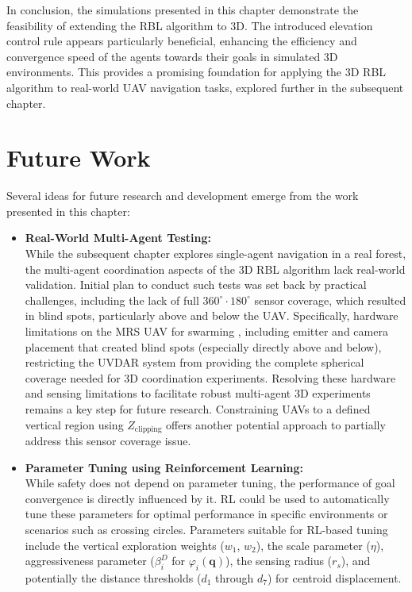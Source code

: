         In conclusion, the simulations presented in this chapter demonstrate the feasibility of extending the \ac{RBL} algorithm to 3D. 
        The introduced elevation control rule appears particularly beneficial, enhancing the efficiency and convergence speed of the agents towards their goals in simulated 3D environments. 
        This provides a promising foundation for applying the 3D \ac{RBL} algorithm to real-world \ac{UAV} navigation tasks, explored further in the subsequent chapter.
    
    \section{Future Work}
        Several ideas for future research and development emerge from the work presented in this chapter:
        \begin{itemize}
            \item \textbf{Real-World Multi-Agent Testing: } \\
            While the subsequent chapter explores single-agent navigation in a real forest, the multi-agent coordination aspects of the 3D \ac{RBL} algorithm lack real-world validation. 
            Initial plan to conduct such tests was set back by practical challenges, including the lack of full $360^{\circ} \cdot 180^{\circ}$ sensor coverage, which resulted in blind spots, particularly above and below the \ac{UAV}.
            Specifically, hardware limitations on the \ac{MRS} \ac{UAV} for swarming \cite{robofly}, including emitter and camera placement that created blind spots (especially directly above and below), restricting the UVDAR system \cite{uvdar_package} from providing the complete spherical coverage needed for 3D coordination experiments.
            Resolving these hardware and sensing limitations to facilitate robust multi-agent 3D experiments remains a key step for future research.
            Constraining \ac{UAV}s to a defined vertical region using $Z_{\text{clipping}}$ offers another potential approach to partially address this sensor coverage issue.
            \item \textbf{Parameter Tuning using Reinforcement Learning: } \\
            While safety does not depend on parameter tuning, the performance of goal convergence is directly influenced by it.
            \ac{RL} could be used to automatically tune these parameters for optimal performance in specific environments or scenarios such as crossing circles. 
            Parameters suitable for \ac{RL}-based tuning include the vertical exploration weights ($w_1$, $w_2$), the scale parameter ($\eta$), aggressiveness parameter ($\beta_i^D$ for $\varphi_i(\mathbf{q})$), the sensing radius ($r_s$), and potentially the distance thresholds ($d_1$ through $d_7$) for centroid displacement.

\end{itemize}
